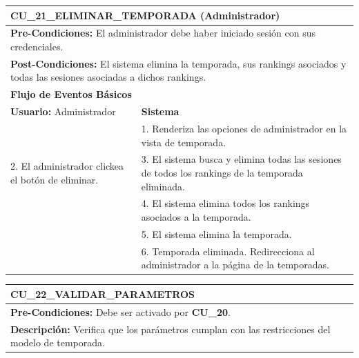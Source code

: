 \begin{center}
  \begin{tabular}{| p{7.5cm} | p{7.5cm} |}
    \hline
    \multicolumn{2}{|p{15cm}|}{\textbf{CU\_21\_ELIMINAR\_TEMPORADA} (Administrador)} \\ \hline
    \multicolumn{2}{|p{15cm}|}{\textbf{Pre-Condiciones:} El administrador debe haber iniciado sesión con sus credenciales.} \\ \hline
    \multicolumn{2}{|p{15cm}|}{\textbf{Post-Condiciones:} El sistema elimina la temporada, sus rankings asociados y todas las sesiones asociadas a dichos rankings.} \\ \hline
    \multicolumn{2}{|p{7.5cm}|}{\textbf{Flujo de Eventos Básicos}} \\ \hline
    \multicolumn{1}{|p{7.5cm}|}{\textbf{Usuario:} Administrador} & \multicolumn{1}{|p{7.5cm}|}{\textbf{Sistema}} \\ \hline
    
    \multicolumn{1}{|p{7.5cm}|}{} & 
    \multicolumn{1}{|p{7.5cm}|}{1. Renderiza las opciones de administrador en la vista de temporada.}\\ \hline
    
    \multicolumn{1}{|p{7.5cm}|}{2. El administrador clickea el botón de eliminar.}& 
    \multicolumn{1}{|p{7.5cm}|}{3. El sistema busca y elimina todas las sesiones de todos los rankings de la temporada eliminada.}\\ \hline
    
    \multicolumn{1}{|p{7.5cm}|}{} & 
    \multicolumn{1}{|p{7.5cm}|}{4. El sistema elimina todos los rankings asociados a la temporada.}\\ \hline
    
    \multicolumn{1}{|p{7.5cm}|}{} & 
    \multicolumn{1}{|p{7.5cm}|}{5. El sistema elimina la temporada.}\\ \hline
    
    \multicolumn{1}{|p{7.5cm}|}{} & 
    \multicolumn{1}{|p{7.5cm}|}{6. Temporada eliminada. Redirecciona al administrador a la página de la temporadas.}\\ \hline
  \end{tabular}
\end{center}

\begin{center}
  \begin{tabular}{| p{7.5cm} | p{7.5cm} |}
    \hline
    \multicolumn{2}{|p{15cm}|}{\textbf{CU\_22\_VALIDAR\_PARAMETROS}} \\ \hline
    \multicolumn{2}{|p{15cm}|}{\textbf{Pre-Condiciones:} Debe ser activado por \textbf{CU\_20}.} \\ \hline
    \multicolumn{2}{|p{15cm}|}{\textbf{Descripción:} Verifica que los parámetros cumplan con las restricciones del modelo de temporada.} \\
    \hline
  \end{tabular}
\end{center}

